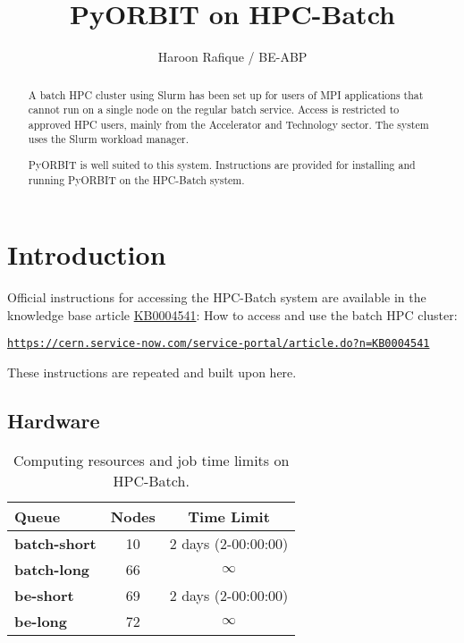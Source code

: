 \documentclass[a4paper]{cernatsnote}
\title{PyORBIT on HPC-Batch}
\author{Haroon Rafique / BE-ABP}
\def \howtoaccess {\url{https://cern.service-now.com/service-portal/article.do?n=KB0004541}}
\begin{document}
	
	\maketitle %
	
	\begin{abstract}
		A batch HPC cluster using Slurm has been set up for users of MPI applications that cannot run on a single node on the regular batch service. Access is restricted to approved HPC users, mainly from the Accelerator and Technology sector. The system uses the Slurm workload manager.
		
		PyORBIT is well suited to this system. Instructions are provided for installing and running PyORBIT on the HPC-Batch system.
	\end{abstract}
	
	\section{Introduction}
	\label{sec:intro}
		
	Official instructions for accessing the HPC-Batch system are available in the knowledge base article \href{https://cern.service-now.com/service-portal/article.do?n=KB0004541}{KB0004541}: How to access and use the batch HPC cluster:
	
	\texttt{\howtoaccess}
	
	These instructions are repeated and built upon here. 
	
	\subsection{Hardware}
	
	\begin{table}
		\begin{center}
			\begin{tabular}[!b]{|l|c|c|}
				\hline
				\textbf{Queue} 			& \textbf{Nodes} & \textbf{Time Limit} \\
				\hline
				\textbf{batch-short}	& 10			  & 2 days (2-00:00:00) \\
				\textbf{batch-long}		& 66			  & $\infty$ \\
				\textbf{be-short}		& 69			  & 2 days (2-00:00:00) \\
				\textbf{be-long}		& 72			  & $\infty$ \\
				\hline
			\end{tabular}
			\caption{Computing resources and job time limits on HPC-Batch.}
			\label{tab:cpus}
		\end{center}
	\end{table}
\end{document}
